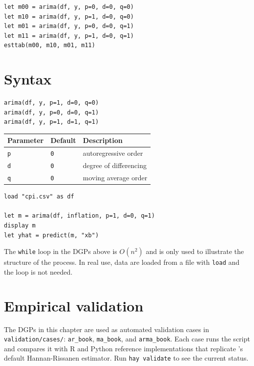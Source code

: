 \begin{lstlisting}[caption={Order selection by AIC}]
let m00 = arima(df, y, p=0, d=0, q=0)
let m10 = arima(df, y, p=1, d=0, q=0)
let m01 = arima(df, y, p=0, d=0, q=1)
let m11 = arima(df, y, p=1, d=0, q=1)
esttab(m00, m10, m01, m11)
\end{lstlisting}

\section{Syntax}

\begin{lstlisting}
arima(df, y, p=1, d=0, q=0)
arima(df, y, p=0, d=0, q=1)
arima(df, y, p=1, d=1, q=1)
\end{lstlisting}

\begin{center}
\begin{tabular}{lll}
\toprule
\textbf{Parameter} & \textbf{Default} & \textbf{Description} \\
\midrule
\texttt{p} & \texttt{0} & autoregressive order \\
\texttt{d} & \texttt{0} & degree of differencing \\
\texttt{q} & \texttt{0} & moving average order \\
\bottomrule
\end{tabular}
\end{center}

\begin{lstlisting}[caption={Typical workflow with real data}]
load "cpi.csv" as df

let m = arima(df, inflation, p=1, d=0, q=1)
display m
let yhat = predict(m, "xb")
\end{lstlisting}

\begin{nota}
  The \lstinline{while} loop in the DGPs above is $O(n^2)$ and is only used to
  illustrate the structure of the process. In real use, data are loaded
  from a file with \lstinline{load} and the loop is not needed.
\end{nota}

\section{Empirical validation}

The DGPs in this chapter are used as automated validation cases in
\texttt{validation/cases/}: \texttt{ar\_book}, \texttt{ma\_book}, and
\texttt{arma\_book}. Each case runs the \hayashi{} script and compares it with
R and Python reference implementations that replicate \hayashi{}'s default
Hannan-Rissanen estimator. Run \lstinline{hay validate} to see the current
status.
